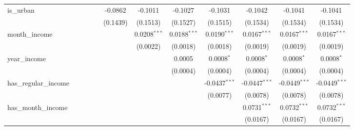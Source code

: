 \begin{table}[htbp]
\begin{tiny}
\begin{tabular}{lccccccccccc}
         is\_urban              &                 &                 &                 &                 & -0.0862         & -0.1011         & -0.1027         & -0.1031         & -0.1042         & -0.1041         & -0.1041\\
                                 &                 &                 &                 &                 & (0.1439)        & (0.1513)        & (0.1527)        & (0.1515)        & (0.1534)        & (0.1534)        & (0.1534)\\
         month\_income          &                 &                 &                 &                 &                 & 0.0208$^{***}$  & 0.0188$^{***}$  & 0.0190$^{***}$  & 0.0167$^{***}$  & 0.0167$^{***}$  & 0.0167$^{***}$\\
                                 &                 &                 &                 &                 &                 & (0.0022)        & (0.0018)        & (0.0018)        & (0.0019)        & (0.0019)        & (0.0019)\\
         year\_income           &                 &                 &                 &                 &                 &                 & 0.0005          & 0.0008$^{*}$    & 0.0008$^{*}$    & 0.0008$^{*}$    & 0.0008$^{*}$\\
                                 &                 &                 &                 &                 &                 &                 & (0.0004)        & (0.0004)        & (0.0004)        & (0.0004)        & (0.0004)\\
         has\_regular\_income  &                 &                 &                 &                 &                 &                 &                 & -0.0437$^{***}$ & -0.0447$^{***}$ & -0.0449$^{***}$ & -0.0449$^{***}$\\
                                 &                 &                 &                 &                 &                 &                 &                 & (0.0077)        & (0.0078)        & (0.0078)        & (0.0078)\\
         has\_month\_income    &                 &                 &                 &                 &                 &                 &                 &                 & 0.0731$^{***}$  & 0.0732$^{***}$  & 0.0732$^{***}$\\
                                 &                 &                 &                 &                 &                 &                 &                 &                 & (0.0167)        & (0.0167)        & (0.0167)\\

\end{tabular}
\end{tiny}
\end{table}
